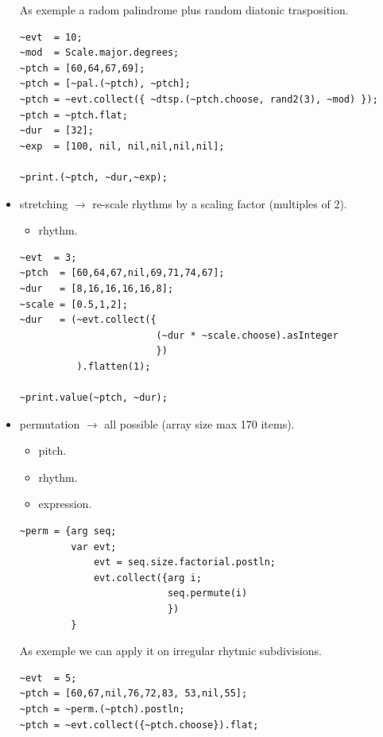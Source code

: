 \begin{itemize}
As exemple a radom palindrome plus random diatonic trasposition.

\begin{lstlisting}
~evt  = 10;
~mod  = Scale.major.degrees;
~ptch = [60,64,67,69];
~ptch = [~pal.(~ptch), ~ptch]; 
~ptch = ~evt.collect({ ~dtsp.(~ptch.choose, rand2(3), ~mod) });
~ptch = ~ptch.flat;
~dur  = [32];
~exp  = [100, nil, nil,nil,nil,nil];

~print.(~ptch, ~dur,~exp);
\end{lstlisting}

\item stretching \(\rightarrow\) re-scale rhythms by a scaling factor (multiples of 2).
    \begin{itemize}
    \tightlist
    \item rhythm.
    \end{itemize}

\begin{lstlisting}[frame=single] 
~evt  = 3; 
~ptch  = [60,64,67,nil,69,71,74,67];
~dur   = [8,16,16,16,16,8];
~scale = [0.5,1,2];         
~dur   = (~evt.collect({ 
                        (~dur * ~scale.choose).asInteger
                        })
          ).flatten(1);

~print.value(~ptch, ~dur);
\end{lstlisting}

\item permutation \(\rightarrow\) all possible (array size max 170 items).
    \begin{itemize}
    \tightlist
    \item pitch.
    \item rhythm.
    \item expression.
    \end{itemize}

\begin{lstlisting}[frame=single, caption=all permutations function] 
~perm = {arg seq;
	     var evt;
	         evt = seq.size.factorial.postln;
	         evt.collect({arg i;
		                  seq.permute(i) 
		                  })
         }
\end{lstlisting}

As exemple we can apply it on irregular rhytmic subdivisions.

\begin{lstlisting}
~evt  = 5;                    
~ptch = [60,67,nil,76,72,83, 53,nil,55];
~ptch = ~perm.(~ptch).postln; 
~ptch = ~evt.collect({~ptch.choose}).flat;


\end{lstlisting}
\end{itemize}
